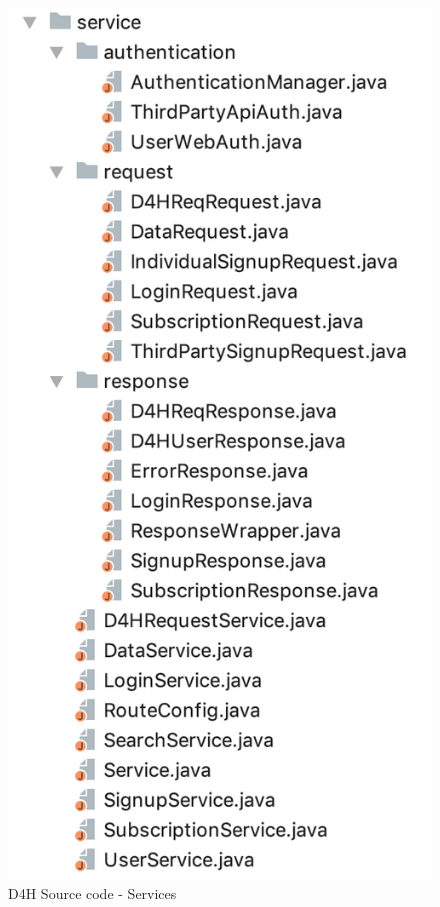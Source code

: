 \documentclass[a4paper, hidelinks, 12pt]{report}
\begin{document}
\begin{itemize}
	\begin{figure}[H]
		\centering
		\includegraphics[scale=0.6]{images/backend/d4h_source_code_services.png}
		\caption[D4H Source code - Services]{D4H Source code - Services}
		\label{fig:d4h_source_code_services}
	\end{figure}


\end{itemize}
\end{document}
